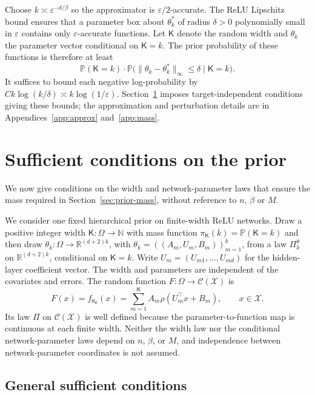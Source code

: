 \documentclass[11pt,a4paper]{article}
\theoremstyle{remark}
\newcommand{\Xcal}{\mathcal X}
\newcommand{\Ccal}{\mathcal C}
\newcommand{\PP}{\mathbb P}
\newcommand{\norm}[1]{\lVert#1\rVert}
\begin{document}
Choose $k\asymp\varepsilon^{-d/\beta}$ so the approximator is
$\varepsilon/2$-accurate. The ReLU Lipschitz bound ensures that a
parameter box about $\theta_k^*$ of radius $\delta>0$ polynomially small
in $\varepsilon$ contains only $\varepsilon$-accurate functions.
Let $\mathsf K$ denote the random width and $\theta_k$ the parameter
vector conditional on $\mathsf K=k$. The prior probability of these
functions is therefore at least
\[
\PP(\mathsf K=k)\cdot
\PP\bigl(\norm{\theta_k-\theta_k^*}_\infty\leq\delta
\mid\mathsf K=k\bigr).
\]
It suffices to bound each negative log-probability by
$Ck\log(k/\delta)\asymp k\log(1/\varepsilon)$.
Section~\ref{sec:prior} imposes target-independent conditions giving
these bounds; the approximation and perturbation details are in
Appendices~\ref{app:approx} and~\ref{app:mass}.

\section{Sufficient conditions on the prior}
\label{sec:prior}\label{sec:mechanism}

We now give conditions on the width and network-parameter laws that ensure the
mass required in Section~\ref{sec:prior-mass}, without reference to
$n$, $\beta$ or $M$.

We consider one fixed hierarchical prior on finite-width ReLU
networks. Draw a positive integer width $\mathsf K:\Omega\to\mathbb N$
with mass function $\pi_{\mathsf K}(k)=\PP(\mathsf K=k)$ and then draw
$\theta_k:\Omega\to\mathbb R^{(d+2)k}$, with
$\theta_k=((A_m,U_m,B_m))_{m=1}^k$, from a law
$\Pi_k^\theta$ on $\mathbb R^{(d+2)k}$, conditional on
$\mathsf K=k$. Write $U_m=(U_{m1},\ldots,U_{md})$ for the
hidden-layer coefficient vector. The width and parameters are independent of the
covariates and errors. The random function
$F:\Omega\to\Ccal(\Xcal)$ is
\begin{equation}\label{eq:network}
F(x)=f_{\theta_{\mathsf K}}(x)
=\sum_{m=1}^{\mathsf K}A_m\rho(U_m^\top x+B_m),
\qquad x\in\Xcal.
\end{equation}
Its law $\Pi$ on $\Ccal(\Xcal)$ is well defined because the
parameter-to-function map is continuous at each finite width.
Neither the width law nor the conditional network-parameter laws depend on
$n$, $\beta$, or $M$, and independence between network-parameter coordinates
is not assumed.

\subsection{General sufficient conditions}
\label{sec:prior-conditions}
\end{document}
